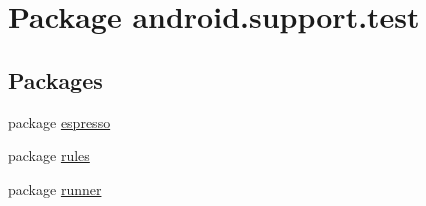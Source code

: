 \hypertarget{namespaceandroid_1_1support_1_1test}{}\section{Package android.\+support.\+test}
\label{namespaceandroid_1_1support_1_1test}
\subsection*{Packages}
\begin{DoxyCompactItemize}
\item 
package \mbox{\hyperlink{namespaceandroid_1_1support_1_1test_1_1espresso}{espresso}}
\item 
package \mbox{\hyperlink{namespaceandroid_1_1support_1_1test_1_1rules}{rules}}
\item 
package \mbox{\hyperlink{namespaceandroid_1_1support_1_1test_1_1runner}{runner}}
\end{DoxyCompactItemize}
